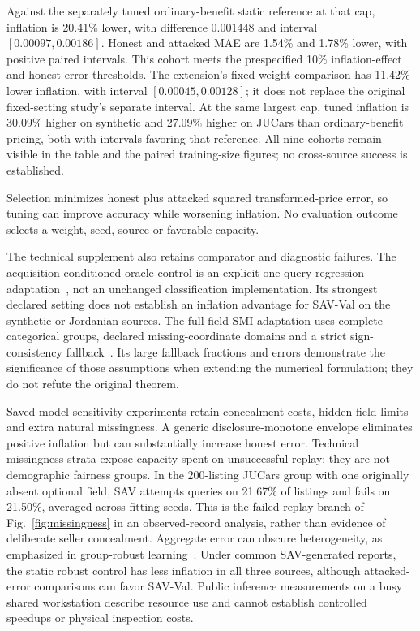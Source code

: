 \documentclass[pdflatex,sn-nature]{sn-jnl}
\begin{document}
Against the separately tuned ordinary-benefit static reference at that cap,
inflation is 20.41\% lower, with difference 0.001448 and interval
$[0.00097,0.00186]$. Honest and attacked MAE are 1.54\% and 1.78\% lower,
with positive paired intervals. This cohort meets the prespecified 10\%
inflation-effect and honest-error thresholds. The extension's fixed-weight
comparison has 11.42\% lower inflation, with interval $[0.00045,0.00128]$;
it does not replace the original fixed-setting study's separate interval.
At the same largest cap, tuned inflation is 30.09\% higher on synthetic and
27.09\% higher on JUCars than ordinary-benefit pricing, both with intervals
favoring that reference. All nine cohorts remain visible in the table and
the paired training-size figures; no cross-source success is established.

Selection minimizes honest plus attacked squared transformed-price error,
so tuning can improve accuracy while worsening inflation. No evaluation
outcome selects a weight, seed, source or favorable capacity.

The technical supplement also retains comparator and diagnostic failures.
The acquisition-conditioned oracle control is an explicit one-query regression
adaptation~\cite{valancius2024aco}, not an unchanged classification implementation.
Its strongest declared setting does not establish an inflation advantage for
SAV-Val on the synthetic or Jordanian sources. The full-field SMI adaptation
uses complete categorical groups, declared missing-coordinate domains and a
strict sign-consistency fallback~\cite{zhang2020strategic}. Its large fallback
fractions and errors demonstrate the significance of those assumptions when
extending the numerical formulation; they do not refute the original theorem.

Saved-model sensitivity experiments retain concealment costs, hidden-field
limits and extra natural missingness. A generic disclosure-monotone envelope
eliminates positive inflation but can substantially increase honest error.
Technical missingness strata expose capacity spent on unsuccessful replay;
they are not demographic fairness groups. In the 200-listing JUCars group
with one originally absent optional field, SAV attempts queries on 21.67\%
of listings and fails on 21.50\%, averaged across fitting seeds. This is the
failed-replay branch of Fig.~\ref{fig:missingness} in an observed-record
analysis, rather than evidence of deliberate seller concealment.
Aggregate error can obscure
heterogeneity, as emphasized in group-robust learning~\cite{sagawa2019groups}.
Under common SAV-generated reports,
the static robust control has less inflation in all three sources, although
attacked-error comparisons can favor SAV-Val. Public inference measurements
on a busy shared workstation describe resource use and cannot establish
controlled speedups or physical inspection costs.
\end{document}
